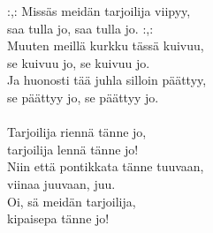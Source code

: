 
            :,: Missäs meidän tarjoilija viipyy, \\
            saa tulla jo, saa tulla jo. :,: \\
            Muuten meillä kurkku tässä kuivuu, \\
            se kuivuu jo, se kuivuu jo. \\
            Ja huonosti tää juhla silloin päättyy, \\
            se päättyy jo, se päättyy jo. \\
\hspace{10mm} \\
            Tarjoilija riennä tänne jo, \\
            tarjoilija lennä tänne jo! \\
            Niin että pontikkata tänne tuuvaan, \\
            viinaa juuvaan, juu. \\
            Oi, sä meidän tarjoilija, \\
            kipaisepa tänne jo! \\
